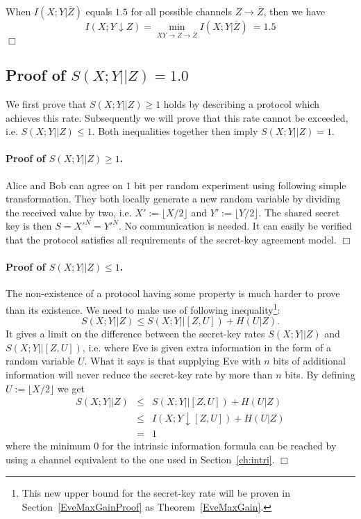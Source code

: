 \documentclass[a4paper, twoside, openany]{report}
\newcommand{\intrivar}[3]{I(#1;#2\!\!\downarrow\!#3)}
\newcommand{\intri}{\intrivar{X}{Y}{Z}}
\newcommand{\srate}{S(X;Y||Z)}
\newcommand{\channel}[2]{#1 \rightarrow #2}
\newcommand{\mchain}[3]{#1 \rightarrow #2 \rightarrow #3}
\newcommand{\ol}[1]{\overline{#1}}
\newcommand{\zol}{\ol{Z}}
\newcommand{\floor}[1]{\lfloor #1 \rfloor}
\theoremstyle{plain}
\theoremstyle{definition}
\newcommand{\proofend}{\hspace*{\fill} $\Box$\\}
\begin{document}
\noindent
When $I(X;Y|\zol)$ equals $1.5$ for all possible channels $\channel{Z}{\zol}$, then we have
\[\intri = \min_{\mchain{XY}{Z}{\zol}} I(X;Y|\zol)\ = 1.5\]
\proofend


\newpage

\subsection{Proof of $\srate = 1.0$} \label{srateIsOne}

We first prove that $\srate \geq 1$ holds by describing a protocol which achieves this rate. Subsequently we will prove that this rate cannot be exceeded, i.e. $\srate \leq 1$. Both inequalities together then imply $\srate = 1$.

\paragraph{Proof of $\srate \geq 1$.} Alice and Bob can agree on $1$ bit per random experiment using following simple transformation. They both locally generate a new random variable by dividing the received value by two, i.e. $X' := \floor{X/2}$ and $Y' := \floor{Y/2}$. The shared secret key is then $S = X'^N = Y'^N$. No communication is needed. It can easily be verified that the protocol satisfies all requirements of the secret-key agreement model.
\proofend

\paragraph{Proof of $\srate \leq 1$.} The non-existence of a protocol having some property is much harder to prove than its existence. We need to make use of following inequality\footnote{This new upper bound for the secret-key rate will be proven in Section~\ref{EveMaxGainProof} as Theorem~\ref{EveMaxGain}.}:
\begin{equation} \label{EveMaxGainUnproven}
S(X;Y||Z) \leq S(X;Y||[Z,U]) + H(U|Z).
\end{equation}
It gives a limit on the difference between the secret-key rates $\srate$ and $S(X;Y||[Z,U])$, i.e. where Eve is given extra information in the form of a random variable $U$. What it says is that supplying Eve with $n$ bits of additional information will never reduce the secret-key rate by more than $n$ bits. By defining $U := \floor{X/2}$ we get
\begin{eqnarray*}
S(X;Y||Z) & \leq & S(X;Y||[Z,U]) + H(U|Z) \\
          & \leq & \intrivar{X}{Y}{[Z,U]} + H(U|Z) \\
          &   =  & 1
\end{eqnarray*}
where the minimum $0$ for the intrinsic information formula can be reached by using a channel equivalent to the one used in Section~\ref{ch:intri}.
\proofend
\end{document}
